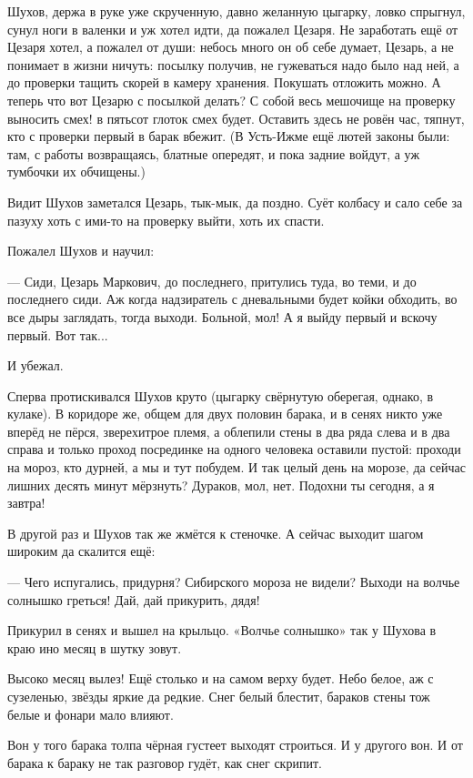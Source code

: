 Шухов, держа в руке уже скрученную, давно желанную цыгарку, ловко спрыгнул, сунул ноги в
валенки и уж хотел идти, да пожалел Цезаря. Не заработать ещё от Цезаря хотел, а пожалел от
души: небось много он об себе думает, Цезарь, а не понимает в жизни ничуть: посылку получив, не
гужеваться надо было над ней, а до проверки тащить скорей в камеру хранения. Покушать \dash
отложить можно. А теперь \dash что вот Цезарю с посылкой делать? С собой весь мешочище на
проверку выносить \dash смех! \dash в пятьсот глоток смех будет. Оставить здесь \dash не ровён час,
тяпнут, кто с проверки первый в барак вбежит. (В Усть-Ижме ещё лютей законы были: там, с работы
возвращаясь, блатные опередят, и пока задние войдут, а уж тумбочки их обчищены.)

Видит Шухов \dash заметался Цезарь, тык-мык, да поздно. Суёт колбасу и сало себе за пазуху \dash хоть
с ими-то на проверку выйти, хоть их спасти.

Пожалел Шухов и научил:

--- Сиди, Цезарь Маркович, до последнего, притулись туда, во теми, и до последнего сиди. Аж
когда надзиратель с дневальными будет койки обходить, во все дыры заглядать, тогда выходи.
Больной, мол! А я выйду первый и вскочу первый. Вот так...

И убежал.

Сперва протискивался Шухов круто (цыгарку свёрнутую оберегая, однако, в кулаке). В коридоре
же, общем для двух половин барака, и в сенях никто уже вперёд не пёрся, зверехитрое племя, а
облепили стены в два ряда слева и в два справа \dash и только проход посрединке на одного
человека оставили пустой: проходи на мороз, кто дурней, а мы и тут побудем. И так целый день на
морозе, да сейчас лишних десять минут мёрзнуть? Дураков, мол, нет. Подохни ты сегодня, а я
завтра!

В другой раз и Шухов так же жмётся к стеночке. А сейчас выходит шагом широким да скалится ещё:

--- Чего испугались, придурня? Сибирского мороза не видели? Выходи на волчье солнышко греться!
Дай, дай прикурить, дядя!

Прикурил в сенях и вышел на крыльцо. «Волчье солнышко» \dash так у Шухова в краю ино месяц в
шутку зовут.

Высоко месяц вылез! Ещё столько \dash и на самом верху будет. Небо белое, аж с сузеленью, звёзды
яркие да редкие. Снег белый блестит, бараков стены тож белые \dash и фонари мало влияют.

Вон у того барака толпа чёрная густеет \dash выходят строиться. И у другого вон. И от барака к
бараку не так разговор гудёт, как снег скрипит.


